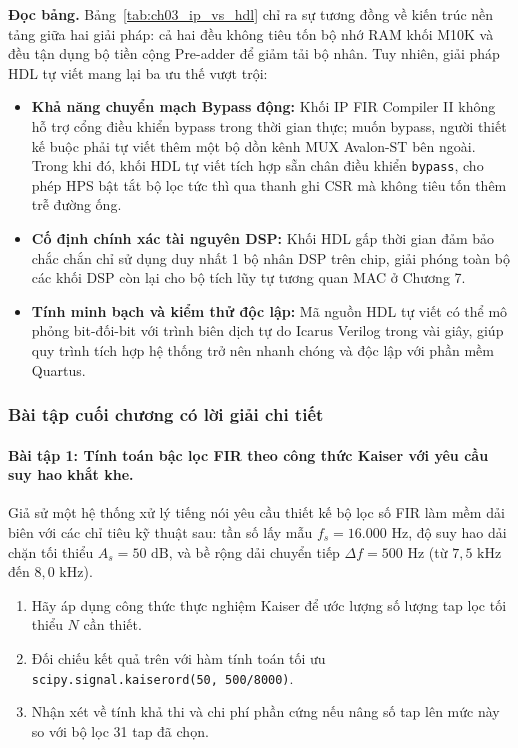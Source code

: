 \textbf{Đọc bảng.} Bảng~\ref{tab:ch03_ip_vs_hdl} chỉ ra sự tương đồng về kiến trúc nền tảng giữa hai giải pháp: cả hai đều không tiêu tốn bộ nhớ RAM khối M10K và đều tận dụng bộ tiền cộng Pre-adder để giảm tải bộ nhân. Tuy nhiên, giải pháp HDL tự viết mang lại ba ưu thế vượt trội:
\begin{itemize}[leftmargin=1.5em, itemsep=2pt]
    \item \textbf{Khả năng chuyển mạch Bypass động:} Khối IP FIR Compiler II không hỗ trợ cổng điều khiển bypass trong thời gian thực; muốn bypass, người thiết kế buộc phải tự viết thêm một bộ dồn kênh MUX Avalon-ST bên ngoài. Trong khi đó, khối HDL tự viết tích hợp sẵn chân điều khiển \texttt{bypass}, cho phép HPS bật tắt bộ lọc tức thì qua thanh ghi CSR mà không tiêu tốn thêm trễ đường ống.
    \item \textbf{Cố định chính xác tài nguyên DSP:} Khối HDL gấp thời gian đảm bảo chắc chắn chỉ sử dụng duy nhất 1 bộ nhân DSP trên chip, giải phóng toàn bộ các khối DSP còn lại cho bộ tích lũy tự tương quan MAC ở Chương 7.
    \item \textbf{Tính minh bạch và kiểm thử độc lập:} Mã nguồn HDL tự viết có thể mô phỏng bit-đối-bit với trình biên dịch tự do Icarus Verilog trong vài giây, giúp quy trình tích hợp hệ thống trở nên nhanh chóng và độc lập với phần mềm Quartus.
\end{itemize}

\subsubsection*{Bài tập cuối chương có lời giải chi tiết}

\paragraph{Bài tập 1: Tính toán bậc lọc FIR theo công thức Kaiser với yêu cầu suy hao khắt khe.}
Giả sử một hệ thống xử lý tiếng nói yêu cầu thiết kế bộ lọc số FIR làm mềm dải biên với các chỉ tiêu kỹ thuật sau: tần số lấy mẫu $f_s = 16.000\text{ Hz}$, độ suy hao dải chặn tối thiểu $A_s = 50\text{ dB}$, và bề rộng dải chuyển tiếp $\Delta f = 500\text{ Hz}$ (từ $7{,}5\text{ kHz}$ đến $8{,}0\text{ kHz}$).
\begin{enumerate}[label=(\alph*)]
    \item Hãy áp dụng công thức thực nghiệm Kaiser để ước lượng số lượng tap lọc tối thiểu $N$ cần thiết.
    \item Đối chiếu kết quả trên với hàm tính toán tối ưu \texttt{scipy.signal.kaiserord(50, 500/8000)}.
    \item Nhận xét về tính khả thi và chi phí phần cứng nếu nâng số tap lên mức này so với bộ lọc 31 tap đã chọn.
\end{enumerate}

